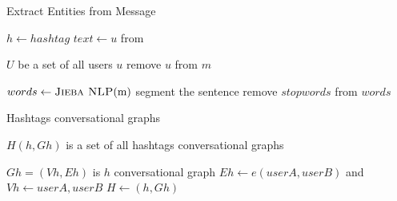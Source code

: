 

\begin{algorithm}[H]
    \caption{Extract Entities from Message}
    \label{algo:message-graph}
    \begin{algorithmic}


            
                \State $h\gets hashtag$
                \State $text\gets u$ from 
            \EndIf

                \State $U$ be a set of all users $u$
                \State remove $u$ from $m$
            \EndIf

            \State $words \gets \Call{Jieba NLP}{$m$}$ segment the sentence
            \State remove $stopwords$ from $words$

        \EndFunction
    \end{algorithmic}
\end{algorithm}

\begin{algorithm}[H]
    \caption{Hashtags conversational graphs}
    \label{algo:hashtags-graph}
    \begin{algorithmic}
        \State $H(h,Gh)$ is a set of all hashtags conversational graphs


                    \State $Gh=(Vh,Eh)$ is $h$ conversational graph
                        \State $Eh \gets e(userA,userB)$ and $Vh \gets userA,userB $
                    \EndIf
                    \State $H \gets (h,Gh)$ 
                \EndIf
            \EndFor
        \EndFunction
    \end{algorithmic}
\end{algorithm}

